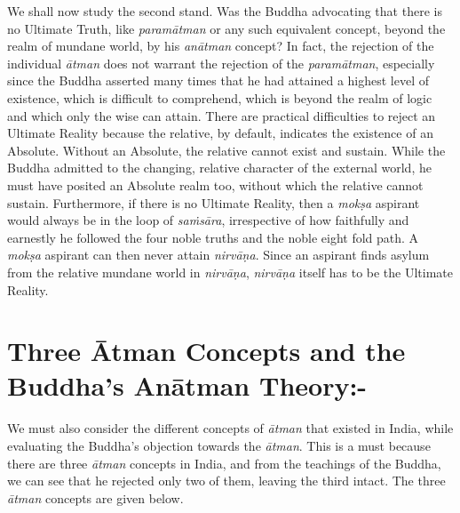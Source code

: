 We shall now study the second stand. Was the Buddha advocating that there is no Ultimate Truth, like \textit{paramātman} or any such equivalent concept, beyond the realm of mundane world, by his \textit{anātman} concept? In fact, the rejection of the individual \textit{ātman} does not warrant the rejection of the \textit{paramātman}, especially since the Buddha asserted many times that he had attained a highest level of existence, which is difficult to comprehend, which is beyond the realm of logic and which only the wise can attain. There are practical difficulties to reject an Ultimate Reality because the relative, by default, indicates the existence of an Absolute. Without an Absolute, the relative cannot exist and sustain. While the Buddha admitted to the changing, relative character of the external world, he must have posited an Absolute realm too, without which the relative cannot sustain. Furthermore, if there is no Ultimate Reality, then a \textit{mokṣa} aspirant would always be in the loop of \textit{saṁsāra}, irrespective of how faithfully and earnestly he followed the four noble truths and the noble eight fold path. A \textit{mokṣa} aspirant can then never attain \textit{nirvāṇa}. Since an aspirant finds asylum from the relative mundane world in \textit{nirvāṇa}, \textit{nirvāṇa} itself has to be the Ultimate Reality.

\vspace{-.3cm}

\section*{Three Ātman Concepts and the Buddha’s Anātman Theory:-}

We must also consider the different concepts of \textit{ātman} that existed in India, while evaluating the Buddha’s objection towards the \textit{ātman}. This is a must because there are three \textit{ātman} concepts in India, and from the teachings of the Buddha, we can see that he rejected only two of them, leaving the third intact. The three \textit{ātman} concepts are given below.

